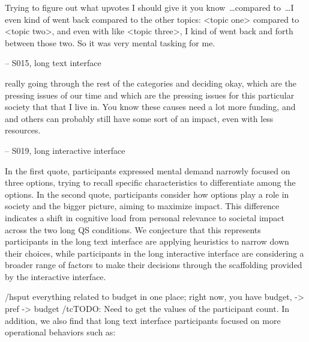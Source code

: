 
\begin{displayquote}
Trying to figure out what upvotes I should give it you know~\ldots compared to~\ldots I even kind of went back compared to the other topics: <topic one> compared to <topic two>, and even with like <topic three>, I kind of went back and forth between those two. \bracketellipsis So it was very mental tasking for me.

\noindent \hfill -- S015, long text interface
\end{displayquote}

    

\begin{displayquote}
\bracketellipsis really going through the rest of the categories and deciding okay, which are the pressing issues of our time and which are the pressing issues for this particular society that that I live in. \bracketellipsis You know these causes need a lot more funding, and and others can probably still have some sort of an impact, even with less resources.

\noindent \hfill -- S019, long interactive interface
\end{displayquote}

In the first quote, participants expressed mental demand narrowly focused on three options, trying to recall specific characteristics to differentiate among the options. In the second quote, participants consider how options play a role in society and the bigger picture, aiming to maximize impact. This difference indicates a shift in cognitive load from personal relevance to societal impact across the two long QS conditions. We conjecture that this represents participants in the long text interface are applying heuristics to narrow down their choices, while participants in the long interactive interface are considering a broader range of factors to make their decisions through the scaffolding provided by the interactive interface. 

/hs{put everything related to budget in one place; right now, you have budget, -> pref -> budget }/tc{TODO: Need to get the values of the participant count.}
In addition, we also find that long text interface participants focused on more operational behaviors such as:

